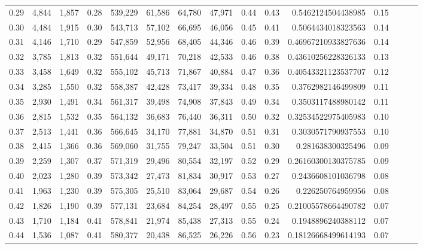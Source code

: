 \begin{tabular}{rrrrrrrrrrrrrrr}
0.29 &   4,844 &  1,857 &  0.28 &  539,229 &   61,586 &   64,780 &   47,971 &  0.44 &  0.43 &      0.5462124504438985 &      0.15 \\
0.30 &   4,484 &  1,915 &  0.30 &  543,713 &   57,102 &   66,695 &   46,056 &  0.45 &  0.41 &      0.5064434018323563 &      0.14 \\
0.31 &   4,146 &  1,710 &  0.29 &  547,859 &   52,956 &   68,405 &   44,346 &  0.46 &  0.39 &     0.46967210933827636 &      0.14 \\
0.32 &   3,785 &  1,813 &  0.32 &  551,644 &   49,171 &   70,218 &   42,533 &  0.46 &  0.38 &     0.43610256228326133 &      0.13 \\
0.33 &   3,458 &  1,649 &  0.32 &  555,102 &   45,713 &   71,867 &   40,884 &  0.47 &  0.36 &     0.40543321123537707 &      0.12 \\
0.34 &   3,285 &  1,550 &  0.32 &  558,387 &   42,428 &   73,417 &   39,334 &  0.48 &  0.35 &      0.3762982146499809 &      0.11 \\
0.35 &   2,930 &  1,491 &  0.34 &  561,317 &   39,498 &   74,908 &   37,843 &  0.49 &  0.34 &      0.3503117488980142 &      0.11 \\
0.36 &   2,815 &  1,532 &  0.35 &  564,132 &   36,683 &   76,440 &   36,311 &  0.50 &  0.32 &     0.32534522975405983 &      0.10 \\
0.37 &   2,513 &  1,441 &  0.36 &  566,645 &   34,170 &   77,881 &   34,870 &  0.51 &  0.31 &      0.3030571790937553 &      0.10 \\
0.38 &   2,415 &  1,366 &  0.36 &  569,060 &   31,755 &   79,247 &   33,504 &  0.51 &  0.30 &       0.281638300325496 &      0.09 \\
0.39 &   2,259 &  1,307 &  0.37 &  571,319 &   29,496 &   80,554 &   32,197 &  0.52 &  0.29 &     0.26160300130375785 &      0.09 \\
0.40 &   2,023 &  1,280 &  0.39 &  573,342 &   27,473 &   81,834 &   30,917 &  0.53 &  0.27 &      0.2436608101036798 &      0.08 \\
0.41 &   1,963 &  1,230 &  0.39 &  575,305 &   25,510 &   83,064 &   29,687 &  0.54 &  0.26 &       0.226250764959956 &      0.08 \\
0.42 &   1,826 &  1,190 &  0.39 &  577,131 &   23,684 &   84,254 &   28,497 &  0.55 &  0.25 &     0.21005578664490782 &      0.07 \\
0.43 &   1,710 &  1,184 &  0.41 &  578,841 &   21,974 &   85,438 &   27,313 &  0.55 &  0.24 &      0.1948896240388112 &      0.07 \\
0.44 &   1,536 &  1,087 &  0.41 &  580,377 &   20,438 &   86,525 &   26,226 &  0.56 &  0.23 &     0.18126668499614193 &      0.07 \\

\end{tabular}
